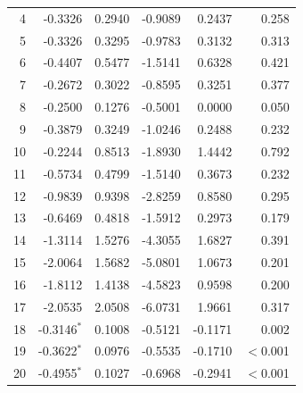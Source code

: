 \begin{longtable}{rrrrrr}
4 & -0.3326 & 0.2940 & -0.9089 & 0.2437 & 0.258 \\
5 & -0.3326 & 0.3295 & -0.9783 & 0.3132 & 0.313 \\
6 & -0.4407 & 0.5477 & -1.5141 & 0.6328 & 0.421 \\
7 & -0.2672 & 0.3022 & -0.8595 & 0.3251 & 0.377 \\
8 & -0.2500 & 0.1276 & -0.5001 & 0.0000 & 0.050 \\
9 & -0.3879 & 0.3249 & -1.0246 & 0.2488 & 0.232 \\
10 & -0.2244 & 0.8513 & -1.8930 & 1.4442 & 0.792 \\
11 & -0.5734 & 0.4799 & -1.5140 & 0.3673 & 0.232 \\
12 & -0.9839 & 0.9398 & -2.8259 & 0.8580 & 0.295 \\
13 & -0.6469 & 0.4818 & -1.5912 & 0.2973 & 0.179 \\
14 & -1.3114 & 1.5276 & -4.3055 & 1.6827 & 0.391 \\
15 & -2.0064 & 1.5682 & -5.0801 & 1.0673 & 0.201 \\
16 & -1.8112 & 1.4138 & -4.5823 & 0.9598 & 0.200 \\
17 & -2.0535 & 2.0508 & -6.0731 & 1.9661 & 0.317 \\
18 & -0.3146$^{*}$ & 0.1008 & -0.5121 & -0.1171 & 0.002 \\
19 & -0.3622$^{*}$ & 0.0976 & -0.5535 & -0.1710 & $<$0.001 \\
20 & -0.4955$^{*}$ & 0.1027 & -0.6968 & -0.2941 & $<$0.001 \\
\end{longtable}
